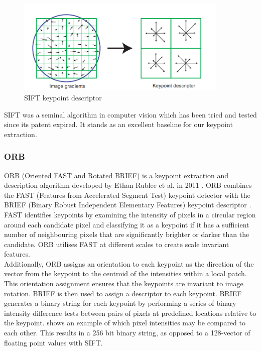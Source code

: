 \begin{figure}[ht]
    \centering
    \includegraphics[width=0.9\textwidth]{figures/SIFT.png}
    \caption{SIFT keypoint descriptor \cite{SIFT}}
    \label{fig:SIFT}
\end{figure}

SIFT was a seminal algorithm in computer vision which has been tried and tested since its patent expired. It stands as an excellent baseline for our keypoint extraction.


\subsubsection{ORB}
ORB (Oriented FAST and Rotated BRIEF) is a keypoint extraction and description algorithm developed by Ethan Rublee et al. in 2011 \cite{ORB}. ORB combines the FAST (Features from Accelerated Segment Test) keypoint detector \cite{FAST} with the BRIEF (Binary Robust Independent Elementary Features) keypoint descriptor \cite{BRIEF}.\\

FAST identifies keypoints by examining the intensity of pixels in a circular region around each candidate pixel and classifying it as a keypoint if it has a sufficient number of neighbouring pixels that are significantly brighter or darker than the candidate. ORB utilises FAST at different scales to create scale invariant features.\\

Additionally, ORB assigns an orientation to each keypoint as the direction of the vector from the keypoint to the centroid of the intensities within a local patch. This orientation assignment ensures that the keypoints are invariant to image rotation.
BRIEF is then used to assign a descriptor to each keypoint. BRIEF generates a binary string for each keypoint by performing a series of binary intensity difference tests between pairs of pixels at predefined locations relative to the keypoint.  shows an example of which pixel intensities may be compared to each other. This results in a 256 bit binary string, as opposed to a 128-vector of floating point values with SIFT.\\

